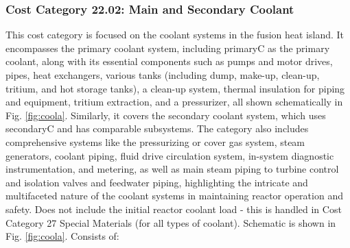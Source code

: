 
\subsubsection{Cost Category 22.02: Main and Secondary Coolant}

This cost category is focused on the coolant systems in the fusion heat island. It encompasses the primary coolant system, including primaryC as the primary coolant, along with its essential components such as pumps and motor drives, pipes, heat exchangers, various tanks (including dump, make-up, clean-up, tritium, and hot storage tanks), a clean-up system, thermal insulation for piping and equipment, tritium extraction, and a pressurizer, all shown schematically in Fig. \ref{fig:coola}. Similarly, it covers the secondary coolant system, which uses secondaryC and has comparable subsystems.  The category also includes comprehensive systems like the pressurizing or cover gas system, steam generators, coolant piping, fluid drive circulation system, in-system diagnostic instrumentation, and metering, as well as main steam piping to turbine control and isolation valves and feedwater piping, highlighting the intricate and multifaceted nature of the coolant systems in maintaining reactor operation and safety.  Does not include the initial reactor coolant load - this is handled in  Cost Category 27 Special Materials (for all types of coolant). Schematic is shown in Fig. \ref{fig:coola}. Consists of:

